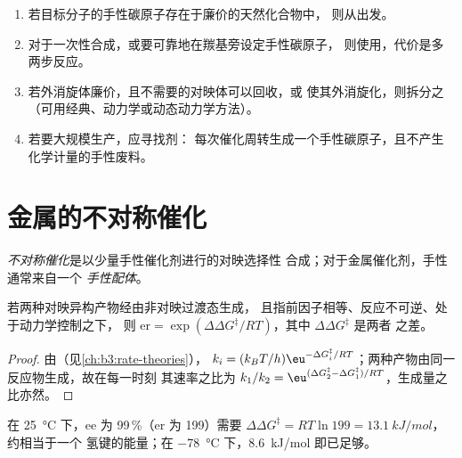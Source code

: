 \begin{method}[选择策略]\label{met:b3:asymmetric-synthesis:strategy}
\begin{enumerate}
  \item 若目标分子的手性碳原子存在于廉价的天然化合物中，
        则从出发。
  \item 对于一次性合成，或要可靠地在羰基旁设定手性碳原子，
        则使用，代价是多两步反应。
  \item 若外消旋体廉价，且不需要的对映体可以回收，或
        使其外消旋化，则拆分之（可用经典、动力学或动态动力学方法）。
  \item 若要大规模生产，应寻找剂：
        每次催化周转生成一个手性碳原子，且不产生化学计量的手性废料。
\end{enumerate}
\end{method}

\section{金属的不对称催化}

\begin{definition}[不对称催化]\label{def:b3:asymmetric-synthesis:asymmetric-catalysis}
\emph{不对称催化}是以少量手性催化剂进行的对映选择性
合成；对于金属催化剂，手性通常来自一个
\emph{手性配体}。
\end{definition}

\begin{theorem}[由能量得到的选择性]\label{thm:b3:asymmetric-synthesis:er-ddg}
若两种对映异构产物经由非对映过渡态生成，
且指前因子相等、反应不可逆、处于动力学控制之下，
则 $\mathrm{er} = \exp(\Delta\Delta G^\ddagger/RT)$，其中 $\Delta\Delta G^\ddagger$ 是两者
之差。
\end{theorem}

\begin{proof}
由（见\cref{ch:b3:rate-theories}），
$k_i = (k_BT/h)\eu^{-\Delta G_i^\ddagger/RT}$；两种产物由同一反应物生成，故在每一时刻
其速率之比为 $k_1/k_2 = \eu^{(\Delta G_2^\ddagger - \Delta G_1^\ddagger)/RT}$，生成量之比亦然。
\end{proof}

在 \qty{25}{\celsius} 下，ee 为 99\,\%（er 为 199）需要 $\Delta\Delta G^\ddagger = RT\ln 199 = \qty{13.1}{kJ/mol}$，约相当于一个
氢键的能量；在 \qty{-78}{\celsius} 下，\qty{8.6}{kJ/mol} 即已足够。


